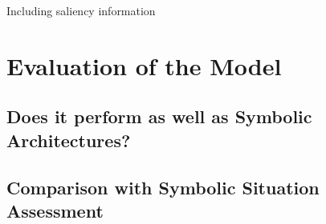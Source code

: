 \documentclass[a4paper]{article}
\begin{document}
Including saliency information

\section{Evaluation of the Model}

\subsection{Does it perform as well as Symbolic Architectures?}
\subsection{Comparison with Symbolic Situation Assessment}






\end{document}

